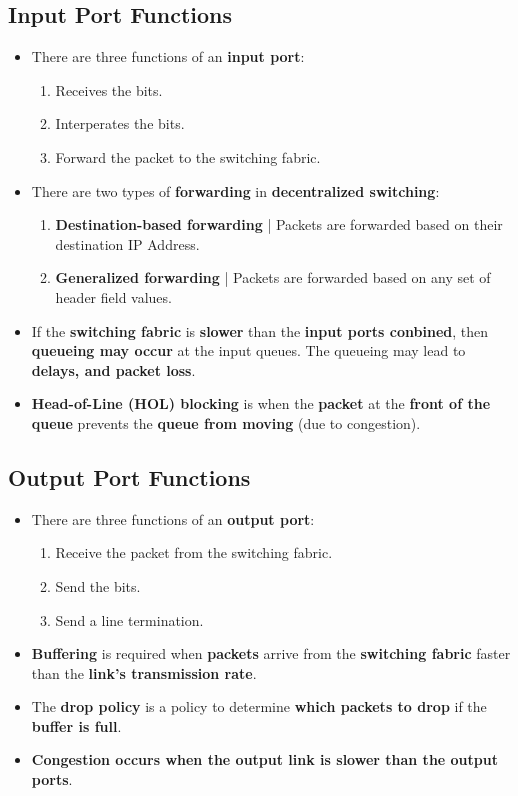\documentclass{article}
\begin{document}
    \subsection*{Input Port Functions}
    \begin{itemize}
        \item There are three functions of an \textbf{input port}:
        \begin{enumerate}
            \item Receives the bits.
            \item Interperates the bits.
            \item Forward the packet to the switching fabric.
        \end{enumerate}
        \item There are two types of \textbf{forwarding} in \textbf{decentralized switching}:
        \begin{enumerate}
            \item \textbf{Destination-based forwarding} | Packets are forwarded based on their destination IP Address.
            \item \textbf{Generalized forwarding} | Packets are forwarded based on any set of header field values.
        \end{enumerate}
        \item If the \textbf{switching fabric} is \textbf{slower} than the \textbf{input ports conbined}, then \textbf{queueing may occur} at the input queues. The queueing may lead to \textbf{delays, and packet loss}.
        \item \textbf{Head-of-Line (HOL) blocking} is when the \textbf{packet} at the \textbf{front of the queue} prevents the \textbf{queue from moving} (due to congestion).
    \end{itemize}

    \subsection*{Output Port Functions}
    \begin{itemize}
        \item There are three functions of an \textbf{output port}:
        \begin{enumerate}
            \item Receive the packet from the switching fabric.
            \item Send the bits.
            \item Send a line termination.
        \end{enumerate}
        \item \textbf{Buffering} is required when \textbf{packets} arrive from the \textbf{switching fabric} faster than the \textbf{link's transmission rate}.
        \item The \textbf{drop policy} is a policy to determine \textbf{which packets to drop} if the \textbf{buffer is full}.
        \item \textbf{Congestion occurs when the output link is slower than the output ports}.
    \end{itemize}
\end{document}
